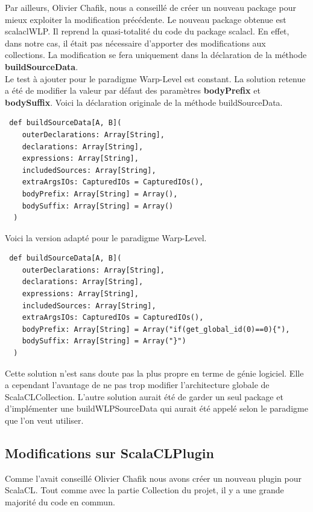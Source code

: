 \documentclass[a4paper,11pt]{report}
\begin{document}
{{\normalsize{
Par ailleurs, Olivier Chafik, nous a conseillé de créer un nouveau package pour mieux exploiter la modification précédente. Le nouveau package obtenue est scalaclWLP. Il reprend la quasi-totalité du code du package scalacl. En effet, dans notre cas, il était pas nécessaire d'apporter des modifications aux collections. La modification se fera uniquement dans la déclaration de la méthode {\bf buildSourceData}.\\

Le test à ajouter pour le paradigme Warp-Level est constant. La solution retenue a été de modifier la valeur par défaut des paramètres {\bf bodyPrefix} et {\bf bodySuffix}. Voici la déclaration originale de la méthode buildSourceData.\\
}

\begin{lstlisting}
 def buildSourceData[A, B](
    outerDeclarations: Array[String],
    declarations: Array[String],
    expressions: Array[String],
    includedSources: Array[String],
    extraArgsIOs: CapturedIOs = CapturedIOs(),
    bodyPrefix: Array[String] = Array(),
    bodySuffix: Array[String] = Array()
  )
\end{lstlisting}
\vspace{6mm}
\normalsize{
\noindent
Voici la version adapté pour le paradigme Warp-Level.\\
}

\begin{lstlisting}
 def buildSourceData[A, B](
    outerDeclarations: Array[String],
    declarations: Array[String],
    expressions: Array[String],
    includedSources: Array[String],
    extraArgsIOs: CapturedIOs = CapturedIOs(),
    bodyPrefix: Array[String] = Array("if(get_global_id(0)==0){"),
    bodySuffix: Array[String] = Array("}")
  )
\end{lstlisting}
\vspace{6mm}
\normalsize{

Cette solution n'est sans doute pas la plus propre en terme de génie logiciel. Elle a cependant l'avantage de ne pas trop modifier l'architecture globale de ScalaCLCollection. L'autre solution aurait été de garder un seul package et d'implémenter une buildWLPSourceData qui aurait été appelé selon le paradigme que l'on veut utiliser.
}

\newpage
\subsection{Modifications sur ScalaCLPlugin}
\vspace{6mm}
\normalsize{
Comme l'avait conseillé Olivier Chafik nous avons créer un nouveau plugin pour ScalaCL. Tout comme avec la partie Collection du projet, il y a une grande majorité du code en commun.\\

}}}
\end{document}
